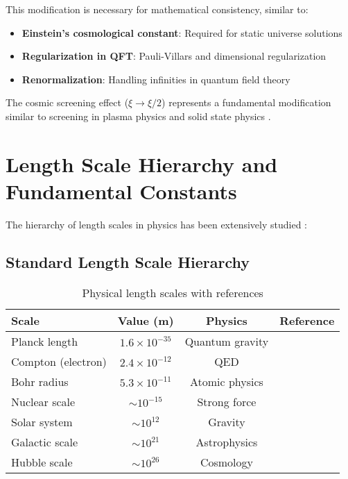\documentclass[12pt,a4paper]{article}
\begin{document}
	This modification is necessary for mathematical consistency, similar to:
	\begin{itemize}
		\item \textbf{Einstein's cosmological constant}: Required for static universe solutions \citep{einstein1917}
		\item \textbf{Regularization in QFT}: Pauli-Villars and dimensional regularization \citep{peskin1995}
		\item \textbf{Renormalization}: Handling infinities in quantum field theory \citep{collins1984}
	\end{itemize}
	
	The cosmic screening effect ($\xi \to \xi/2$) represents a fundamental modification similar to screening in plasma physics \citep{chen1984} and solid state physics \citep{ashcroft1976}.
	
	\section{Length Scale Hierarchy and Fundamental Constants}
	\label{sec:length_scales}
	
	The hierarchy of length scales in physics has been extensively studied \citep{weinberg1995,wilczek2001,carr2007}:
	
	\subsection{Standard Length Scale Hierarchy}
	\label{subsec:standard_hierarchy}
	
	\begin{table}[htbp]
		\centering
		\begin{tabular}{lccc}
			\toprule
			\textbf{Scale} & \textbf{Value (m)} & \textbf{Physics} & \textbf{Reference} \\
			\midrule
			Planck length & $1.6 \times 10^{-35}$ & Quantum gravity & \citep{planck1900,weinberg1995} \\
			Compton (electron) & $2.4 \times 10^{-12}$ & QED & \citep{compton1923,peskin1995} \\
			Bohr radius & $5.3 \times 10^{-11}$ & Atomic physics & \citep{bohr1913,griffiths2004} \\
			Nuclear scale & $\sim 10^{-15}$ & Strong force & \citep{evans1955,perkins2000} \\
			Solar system & $\sim 10^{12}$ & Gravity & \citep{weinberg1972,will2014} \\
			Galactic scale & $\sim 10^{21}$ & Astrophysics & \citep{binney2008,carroll2006} \\
			Hubble scale & $\sim 10^{26}$ & Cosmology & \citep{weinberg2008,peebles1993} \\
			\bottomrule
		\end{tabular}
		\caption{Physical length scales with references}
		\label{tab:length_scales}
	\end{table}
	
\end{document}
